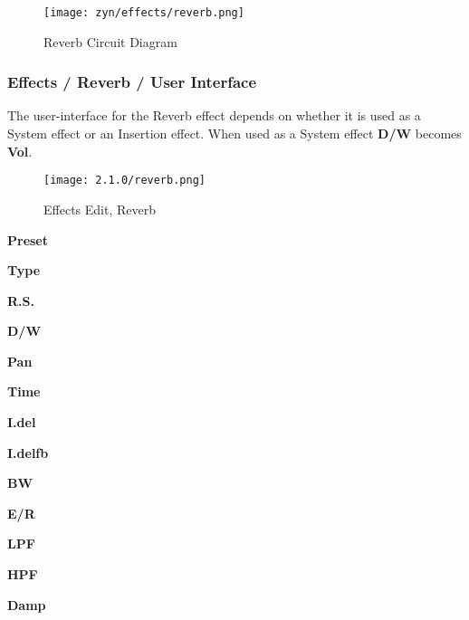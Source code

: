 \begin{figure}[H]
   \centering
   \texttt{[image: zyn/effects/reverb.png]}
   \caption{Reverb Circuit Diagram}
   \label{fig:reverb_circuit_diagram}
\end{figure}

\subsubsection{Effects / Reverb / User Interface}
\label{subsubsec:effects_edit_reverb_ui}

   The user-interface for the Reverb effect depends on whether it is used as a
   System effect or an Insertion effect. When used as a System effect \textbf{D/W} becomes \textbf{Vol}.
\iffalse
   Observr \figureref{fig:effects_edit_reverb}, where
   the Insertion mode is shown.  In the System mode, only the light-blue
   portion of the user-interface appears.
\fi
\begin{figure}[H]
   \centering
   \texttt{[image: 2.1.0/reverb.png]}
   \caption{Effects Edit, Reverb}
   \label{fig:effects_edit_reverb}
\end{figure}

   \begin{enumber}
      \item \textbf{Preset}
      \item \textbf{Type}
      \item \textbf{R.S.}
      \item \textbf{D/W}
      \item \textbf{Pan}
      \item \textbf{Time}
      \item \textbf{I.del}
      \item \textbf{I.delfb}
      \item \textbf{BW}
      \item \textbf{E/R}
      \item \textbf{LPF}
      \item \textbf{HPF}
      \item \textbf{Damp}
   \end{enumber}
\iffalse
???
  There is a fourth type we have screen captures for, but we can't seem
  to navigate to them now!  Are these now out-of-date screen captures?
This belongs elsewhere
   \begin{enumber}
      \item \textbf{FX No.}
      \item \textbf{bypass}
      \item \textbf{EffType}
      \item \textbf{Send To}
      \item \textbf{C}
      \item \textbf{P}
      \item \textbf{Close}
   \end{enumber}
\fi
   \setcounter{ItemCounter}{0}      %


